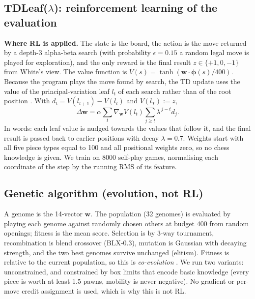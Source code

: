 \subsection{TDLeaf($\lambda$): reinforcement learning of the evaluation}
\textbf{Where RL is applied.} The state is the board, the action is the move returned by a depth-3 alpha-beta search (with probability $\epsilon=0.15$ a random legal move is played for exploration), and the only reward is the final result $z\in\{+1,0,-1\}$ from White's view. The value function is $V(s)=\tanh(\mathbf{w}\cdot\boldsymbol\phi(s)/400)$. Because the program plays the move found by search, the TD update uses the value of the principal-variation leaf $l_t$ of each search rather than of the root position \cite{baxter2000}. With $d_t=V(l_{t+1})-V(l_t)$ and $V(l_T):=z$,
\begin{equation}
\Delta\mathbf{w}=\alpha\sum_{t}\nabla_{\mathbf{w}}V(l_t)\sum_{j\ge t}\lambda^{\,j-t}d_j .
\end{equation}
In words: each leaf value is nudged towards the values that follow it, and the final result is passed back to earlier positions with decay $\lambda=0.7$. Weights start with all five piece types equal to 100 and all positional weights zero, so no chess knowledge is given. We train on 8000 self-play games, normalising each coordinate of the step by the running RMS of its feature.

\subsection{Genetic algorithm (evolution, not RL)}
A genome is the 14-vector $\mathbf{w}$. The population (32 genomes) is evaluated by playing each genome against randomly chosen others at budget 400 from random openings; fitness is the mean score. Selection is by 3-way tournament, recombination is blend crossover (BLX-0.3), mutation is Gaussian with decaying strength, and the two best genomes survive unchanged (elitism). Fitness is relative to the current population, so this is \emph{co-evolution} \cite{rosin1997}. We run two variants: unconstrained, and constrained by box limits that encode basic knowledge (every piece is worth at least 1.5 pawns, mobility is never negative). No gradient or per-move credit assignment is used, which is why this is not RL.

